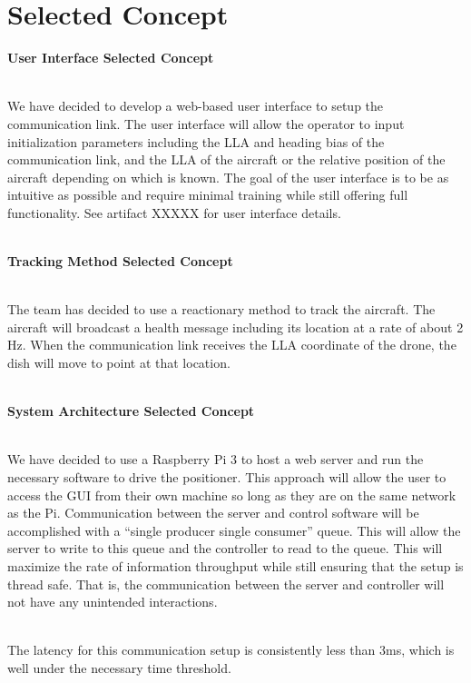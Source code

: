\chapter{Selected Concept}

\textbf{User Interface Selected Concept} 

~\\
We have decided to develop a web-based user interface to setup the communication link. The user interface will allow the operator to input initialization parameters including the LLA and heading bias of the communication link, and the LLA of the aircraft or the relative position of the aircraft depending on which is known. The goal of the user interface is to be as intuitive as possible and require minimal training while still offering full functionality. See artifact XXXXX for user interface details. 

~\\
\textbf{Tracking Method Selected Concept} 

 ~\\
The team has decided to use a reactionary method to track the aircraft. The aircraft will broadcast a health message including its location at a rate of about 2 Hz. When the communication link receives the LLA coordinate of the drone, the dish will move to point at that location.  

~\\
\textbf{System Architecture Selected Concept} 

 ~\\
We have decided to use a Raspberry Pi 3 to host a web server and run the necessary software to drive the positioner. This approach will allow the user to access the GUI from their own machine so long as they are on the same network as the Pi. Communication between the server and control software will be accomplished with a “single producer single consumer” queue. This will allow the server to write to this queue and the controller to read to the queue. This will maximize the rate of information throughput while still ensuring that the setup is thread safe. That is, the communication between the server and controller will not have any unintended interactions.   

 ~\\
The latency for this communication setup is consistently less than 3ms, which is well under the necessary time threshold.   